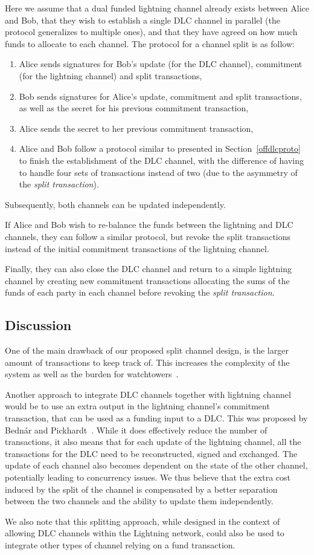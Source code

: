 Here we assume that a dual funded lightning channel already exists between Alice and Bob, that they wish to establish a single DLC channel in parallel (the protocol generalizes to multiple ones), and that they have agreed on how much funds to allocate to each channel.
The protocol for a channel split is as follow:
\begin{enumerate}
  \item Alice sends signatures for Bob's update (for the DLC channel), commitment (for the lightning channel) and split transactions,
  \item Bob sends signatures for Alice's update, commitment and split transactions, as well as the secret for his previous commitment transaction,
  \item Alice sends the secret to her previous commitment transaction,
  \item Alice and Bob follow a protocol similar to presented in Section~\ref{offdlcproto} to finish the establishment of the DLC channel, with the difference of having to handle four sets of transactions instead of two (due to the asymmetry of the \emph{split transaction}).
\end{enumerate}

Subsequently, both channels can be updated independently.

If Alice and Bob wish to re-balance the funds between the lightning and DLC channels, they can follow a similar protocol, but revoke the split transactions instead of the initial commitment transactions of the lightning channel.

Finally, they can also close the DLC channel and return to a simple lightning channel by creating new commitment transactions allocating the sums of the funds of each party in each channel before revoking the \emph{split transaction}.

\subsection{Discussion}\label{discuss}

One of the main drawback of our proposed split channel design, is the larger amount of transactions to keep track of.
This increases the complexity of the system as well as the burden for watchtowers~\cite{khabbazian2019}.

Another approach to integrate DLC channels together with lightning channel would be to use an extra output in the lightning channel's commitment transaction, that can be used as a funding input to a DLC.
This was proposed by Bedn\'ar and Pickhardt~\cite{bednar2019}.
While it does effectively reduce the number of transactions, it also means that for each update of the lightning channel, all the transactions for the DLC need to be reconstructed, signed and exchanged.
The update of each channel also becomes dependent on the state of the other channel, potentially leading to concurrency issues.
We thus believe that the extra cost induced by the split of the channel is compensated by a better separation between the two channels and the ability to update them independently.

We also note that this splitting approach, while designed in the context of allowing DLC channels within the Lightning network, could also be used to integrate other types of channel relying on a fund transaction.
